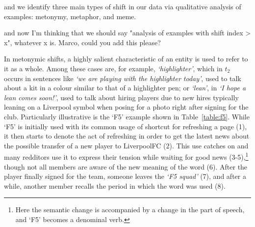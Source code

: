 

 and we identify three main types of shift in our data via qualitative analysis of examples: metonymy, metaphor, and meme.  


and now I'm thinking that we should say "analysis of examples with shift 
index > x", whatever x is. Marco, could you add this please?


In metonymic shifts, a highly salient characteristic of an entity is used to refer to it as a whole. Among these cases are, for example, {\em `highlighter'}, which in $t_2$ occurs in sentences like \textit{`we are playing with the highlighter today'},
used to talk about a kit in a colour similar to that of a highlighter pen; or {\em `lean'}, in \textit{`I hope a lean comes soon!'},
used to talk about hiring players due to new hires typically leaning on a Liverpool symbol when posing for a photo right after signing for the club. Particularly illustrative is the `F5' example shown in
Table~\ref{table:f5}. While `F5' is initially used with its common usage of shortcut for refreshing a page (1), it then starts to denote the act of refreshing in order to get the latest news about the possible transfer of a new player to LiverpoolFC (2). This use catches on and many redditors use it to express their tension while waiting for good news (3-5),\footnote{Here the semantic change is accompanied by a change in the part of speech, and `F5' becomes a denominal verb.}
though not all members are aware of the new meaning of the word (6). After the player finally signed for the team, someone leaves the {\em `F5 squad'} (7), and after a while, another member recalls the period in which the word was used (8).


